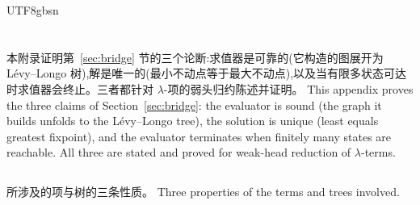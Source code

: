 \begin{CJK*}{UTF8}{gbsn}
  \section{}\label{app:faithful}
  \ifTablambdaChinese
  本附录证明第~\ref{sec:bridge} 节的三个论断:求值器是可靠的(它构造的图展开为 Lévy--Longo 树),解是唯一的(最小不动点等于最大不动点),以及当有限多状态可达时求值器会终止。三者都针对 $\lambda$-项的弱头归约陈述并证明。
  \else
  This appendix proves the three claims of Section~\ref{sec:bridge}: the evaluator is sound (the graph it builds unfolds to the L\'evy--Longo tree), the solution is unique (least equals greatest fixpoint), and the evaluator terminates when finitely many states are reachable. All three are stated and proved for weak-head reduction of $\lambda$-terms.
  \fi

  \subsection{}

  \ifTablambdaChinese
  所涉及的项与树的三条性质。
  \else
  Three properties of the terms and trees involved.
  \fi


\end{CJK*}
